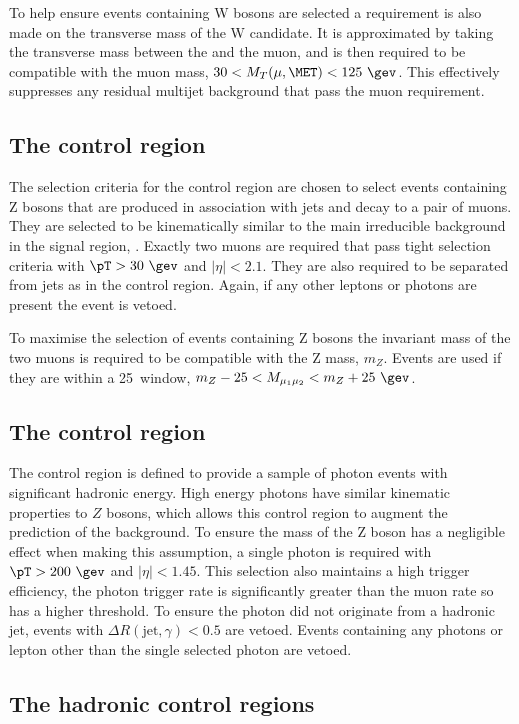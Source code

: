 To help ensure events containing W bosons are selected a requirement
is also made on the transverse mass of the W candidate. It is
approximated by taking the transverse mass between the \MET and the
muon, and is then required to be compatible with the muon mass,
$30<M_T(\mu,\MET)<125~\gev$. This effectively suppresses any residual
\QCD multijet background that pass the muon requirement.

\subsection{The \mmj control region}

The selection criteria for the \mmj control region are chosen to
select events containing Z bosons that are produced in association
with jets and decay to a pair of muons. They are selected to be
kinematically similar to the main irreducible background in the signal
region, \znunu. Exactly two muons are required that
pass tight selection criteria with $\pT>30~\gev$ and $|\eta|<2.1$.
They are also required to be separated from jets as in the \mj control
region. Again, if any other leptons or photons are present the event
is vetoed.

To maximise the selection of events containing Z bosons the
invariant mass of the two muons is required to be compatible with the
Z mass, $m_Z$. Events are used if they are within a 25~\gev window,
$m_Z-25<M_{\mu_1\mu_2}<m_Z+25~\gev$.

\subsection{The \gj control region}

The \gj control region is defined to provide a sample of photon events
with significant hadronic energy. High energy photons have similar
kinematic properties to $Z$ bosons, which allows this control region
to augment the prediction of the \znunu background. To
ensure the mass of the Z boson has a negligible effect when making
this assumption, a single photon is required with $\pT>200~\gev$ and
$|\eta|<1.45$. This selection also maintains a high trigger
efficiency, the photon trigger rate is significantly greater than the
muon rate so has a higher \pT threshold. To ensure the photon did not
originate from a hadronic jet, events with $\Delta
R(\mathrm{jet},\gamma)<0.5$ are vetoed. Events containing any photons
or lepton other than the single selected photon are vetoed.

\subsection{The hadronic control regions}

